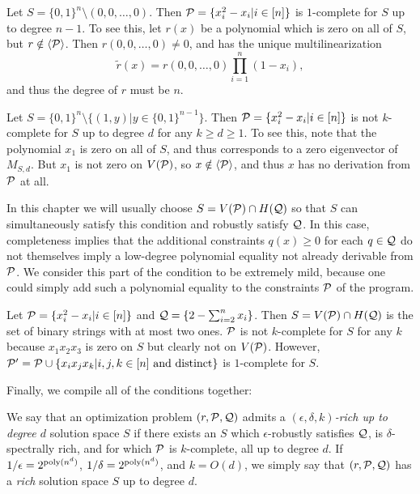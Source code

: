 \begin{example}
Let $S = \{0,1\}^n \setminus (0,0,\dots,0)$. Then $\mathcal P = \{x_i^2 - x_i | i \in [n]\}$ is $1$-complete for $S$ up to degree $n-1$. To see this, let $r(x)$ be a polynomial which is zero on all of $S$, but $r \notin \langle \mathcal P \rangle$. Then $r(0,0,\dots,0) \neq 0$, and has the unique multilinearization 
\[\tilde{r}(x) = r(0,0,\dots,0)\prod_{i=1}^n \left(1-x_i\right),\]
and thus the degree of $r$ must be $n$.
\end{example}
\begin{example}\label{ex:not-complete}
Let $S = \{0,1\}^n \setminus \{(1,y) | y \in \{0,1\}^{n-1}\}$. Then $\mathcal P = \{x_i^2 - x_i | i \in [n]\}$ is not $k$-complete for $S$ up to degree $d$ for any $k \geq d \geq 1$. To see this, note that the polynomial $x_1$ is zero on all of $S$, and thus corresponds to a zero eigenvector of $M_{S,d}$. But $x_1$ is not zero on $V(\mathcal P)$, so $x \notin \langle \mathcal P \rangle$, and thus $x$ has no derivation from $\mathcal P$ at all. 
\end{example}
In this chapter we will usually choose $S = V(\mathcal P) \cap H(\mathcal Q)$ so that $S$ can simultaneously satisfy this condition and robustly satisfy $\mathcal Q$. In this case, completeness implies that the additional constraints $q(x) \geq 0$ for each $q \in \mathcal Q$ do not themselves imply a low-degree polynomial equality not already derivable from $\mathcal P$. We consider this part of the condition to be extremely mild, because one could simply add such a polynomial equality to the constraints $\mathcal P$ of the program. 
\begin{example}
Let $\mathcal P = \{x_i^2 - x_i | i \in [n]\}$ and $\mathcal Q = \{2 - \sum_{i=2}^n x_i\}$. Then $S = V(\mathcal P) \cap H(\mathcal Q)$ is the set of binary strings with at most two ones. $\mathcal P$ is not $k$-complete for $S$ for any $k$ because $x_1x_2x_3$ is zero on $S$ but clearly not on $V(\mathcal P)$. However, $\mathcal P' = \mathcal P \cup \{x_ix_jx_k | i,j,k \in [n] \text{ and distinct}\}$ is $1$-complete for $S$.
\end{example}

Finally, we compile all of the conditions together:
\begin{definition}
We say that an optimization problem $(r, \mathcal P, \mathcal Q)$ admits a \emph{$(\epsilon,\delta,k)$-rich up to degree $d$} solution space $S$ if there exists an $S$ which $\epsilon$-robustly satisfies $\mathcal Q$, is $\delta$-spectrally rich, and for which $\mathcal P$ is $k$-complete, all up to degree $d$. If $1/\epsilon = 2^{\operatorname{poly}(n^d)}$, $1/\delta = 2^{\operatorname{poly}(n^d)}$, and $k = O(d)$, we simply say that $(r, \mathcal P, \mathcal Q)$ has a \emph{rich} solution space $S$ up to degree $d$.
\end{definition}

